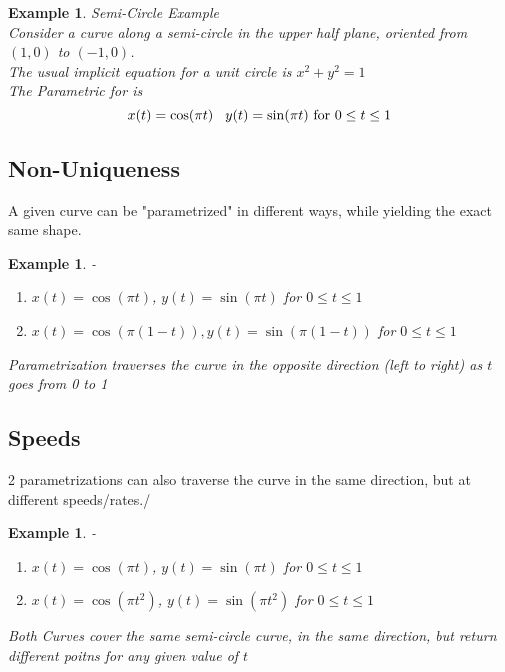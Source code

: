 \documentclass[twoside]{article}
\newtheorem{ex}[theorem]{Example}
\begin{document}
\begin{ex} Semi-Circle Example \\
Consider a curve along a semi-circle in the upper half plane, oriented from \((1,0)\) to \((-1,0)\).\\
The usual implicit equation for a unit circle is \(x^2 + y^2 = 1\)\\

The Parametric for is 
$$ x(t) = \cos (\pi t) \\ \hspace{0.3cm} y(t) = \sin(\pi t) \text{ for } 0 \leq t \leq 1$$
\end{ex}

\subsection{Non-Uniqueness}
A given curve can be "parametrized" in different ways, while yielding the exact same shape.

\begin{ex}-\\
\begin{enumerate}
\item \(x(t) = \cos (\pi t)\), \(y(t) = \sin(\pi t)\) for \(0 \leq t \leq 1\)
\item \(x(t) = \cos(\pi ( 1 - t)), y(t) = \sin(\pi (1 - t)) \) for \(0 \leq t \leq 1\)
\end{enumerate}
Parametrization traverses the curve in the opposite direction (left to right) as \(t\) goes from 0 to 1
\end{ex}


\subsection{Speeds}
2 parametrizations can also traverse the curve in the same direction, but at different speeds/rates./ \begin{ex}-
\begin{enumerate}
\item \(x(t) = \cos (\pi t)\), \(y(t) = \sin(\pi t)\) for \(0 \leq t \leq 1\)
\item \(x(t) = \cos (\pi t^2)\), \(y(t) = \sin(\pi t^2)\) for \(0 \leq t \leq 1\)
\end{enumerate} 
Both Curves cover the same semi-circle curve, in the same direction, but return different poitns for any given value of \(t\) 
\end{ex}
\end{document}
